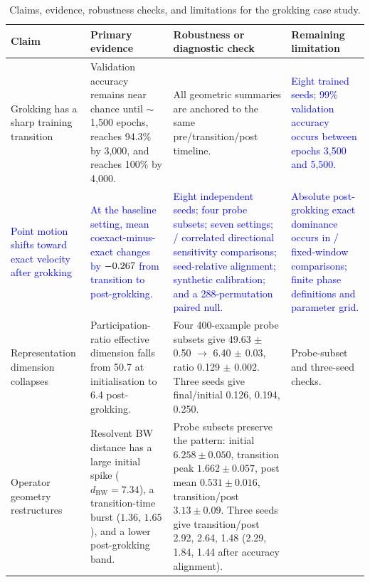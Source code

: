 \documentclass[11pt]{article}
\newcommand{\BW}{\mathrm{BW}}
\newcommand{\addedtext}[1]{\textcolor{blue}{#1}}
\theoremstyle{remark}
\begin{document}
\begin{table}[htbp]
\centering
\caption{Claims, evidence, robustness checks, and limitations for the grokking case study.}
\label{tab:grokking-claims-evidence}
\scriptsize
\setlength{\tabcolsep}{3pt}
\renewcommand{\arraystretch}{1.08}
\begin{tabular}{@{}>{\raggedright\arraybackslash}p{}%
>{\raggedright\arraybackslash}p{}%
>{\raggedright\arraybackslash}p{}%
>{\raggedright\arraybackslash}p{}@{}}
\toprule
\textbf{Claim} & \textbf{Primary evidence} & \textbf{Robustness or diagnostic check} & \textbf{Remaining limitation} \\
\midrule
Grokking has a sharp training transition &
Validation accuracy remains near chance until $\sim$1{,}500 epochs, reaches 94.3\% by 3{,}000, and reaches 100\% by 4{,}000. &
All geometric summaries are anchored to the same pre/transition/post timeline. &
\addedtext{Eight trained seeds; 99\% validation accuracy occurs between epochs 3{,}500 and 5{,}500.} \\
\addlinespace[0.2em]
\addedtext{Point motion shifts toward exact velocity after grokking} &
\addedtext{At the baseline setting, mean coexact-minus-exact changes by $-0.267$ from transition to post-grokking.} &
\addedtext{Eight independent seeds; four probe subsets; seven settings; \HodgeFixedNegativeComparisons/\HodgeSensitivityComparisons{} correlated directional sensitivity comparisons; seed-relative alignment; synthetic calibration; and a 288-permutation paired null.} &
\addedtext{Absolute post-grokking exact dominance occurs in \HodgeFixedPostExactComparisons/\HodgeSensitivityComparisons{} fixed-window comparisons; finite phase definitions and parameter grid.} \\
\addlinespace[0.2em]
Representation dimension collapses &
Participation-ratio effective dimension falls from 50.7 at initialisation to 6.4 post-grokking. &
Four 400-example probe subsets give 49.63 $\pm$ 0.50 $\to$ 6.40 $\pm$ 0.03, ratio 0.129 $\pm$ 0.002. Three seeds give final/initial 0.126, 0.194, 0.250. &
Probe-subset and three-seed checks. \\
\addlinespace[0.2em]
Operator geometry restructures &
Resolvent BW distance has a large initial spike ($d_{\BW}=7.34$), a transition-time burst ($1.36$, $1.65$), and a lower post-grokking band. &
Probe subsets preserve the pattern: initial $6.258\pm0.050$, transition peak $1.662\pm0.057$, post mean $0.531\pm0.016$, transition/post $3.13\pm0.09$. Three seeds give transition/post 2.92, 2.64, 1.48 (2.29, 1.84, 1.44 after accuracy alignment). &

\end{tabular}
\end{table}
\end{document}
